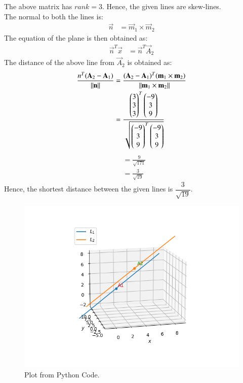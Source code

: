 \documentclass[journal,12pt,twocolumn]{IEEEtran}
\begin{document}
The above matrix has $rank = 3$. Hence, the given lines are skew-lines.\\
The normal to both the lines is:
\begin{align}
    \vec{n} &= \vec{m}_1 \times \vec{m}_2
\end{align}
The equation of the plane is then obtained as:
\begin{align}
    \vec{n}^T\vec{x} &= \vec{n}^T\vec{A}_2
\end{align}
The distance of the above line from $\vec{A}_2$ is obtained as:
\begin{align}
    \frac{n^T(\mathbf{A}_2 - \mathbf{A}_1)}{\lVert\mathbf{n}\rVert} &= \frac{(\mathbf{A}_2 - \mathbf{A}_1)^T(\mathbf{m}_1 \times \mathbf{m}_2)}{\lVert\mathbf{m}_1 \times \mathbf{m}_2\rVert}\\
    &= \frac{\begin{pmatrix}3\\3\\3\end{pmatrix}^T\begin{pmatrix}-9\\3\\9\end{pmatrix}}{\sqrt{\begin{pmatrix}-9\\3\\9\end{pmatrix}^T\begin{pmatrix}-9\\3\\9\end{pmatrix}}}
\end{align}
\begin{align}
    &= \frac{9}{\sqrt{171}}\\
    &= \frac{3}{\sqrt{19}}
\end{align}
Hence, the shortest distance between the given lines is $\dfrac{3}{\sqrt{19}}$.
\begin{figure}[h]
    \centering
    \includegraphics[scale = 0.5]{figure/Figure_1.png}
    \caption{Plot from Python Code.}
    \label{fig:my_label}
\end{figure}
\end{document}
